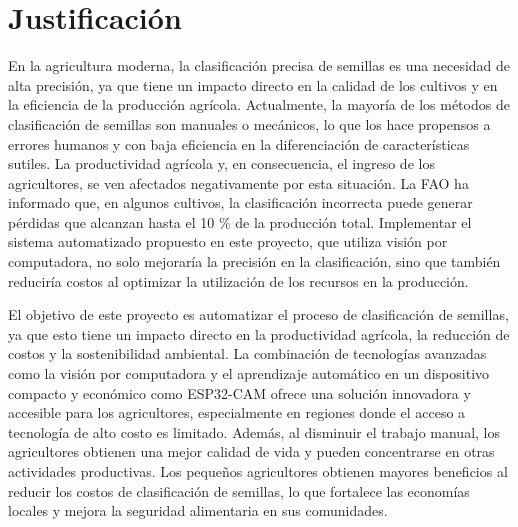 \section{Justificación}

En la agricultura moderna, la clasificación precisa de semillas es una necesidad de alta precisión, ya que tiene un impacto directo en la calidad de los cultivos y en la eficiencia de la producción agrícola. Actualmente, la mayoría de los métodos de clasificación de semillas son manuales o mecánicos, lo que los hace propensos a errores humanos y con baja eficiencia en la diferenciación de características sutiles. La productividad agrícola y, en consecuencia, el ingreso de los agricultores, se ven afectados negativamente por esta situación. La FAO ha informado que, en algunos cultivos, la clasificación incorrecta puede generar pérdidas que alcanzan hasta el 10 \% de la producción total. Implementar el sistema automatizado propuesto en este proyecto, que utiliza visión por computadora, no solo mejoraría la precisión en la clasificación, sino que también reduciría costos al optimizar la utilización de los recursos en la producción.


El objetivo de este proyecto es automatizar el proceso de clasificación de semillas, ya que esto tiene un impacto directo en la productividad agrícola, la reducción de costos y la sostenibilidad ambiental. La combinación de tecnologías avanzadas como la visión por computadora y el aprendizaje automático en un dispositivo compacto y económico como ESP32-CAM ofrece una solución innovadora y accesible para los agricultores, especialmente en regiones donde el acceso a tecnología de alto costo es limitado. Además, al disminuir el trabajo manual, los agricultores obtienen una mejor calidad de vida y pueden concentrarse en otras actividades productivas. Los pequeños agricultores obtienen mayores beneficios al reducir los costos de clasificación de semillas, lo que fortalece las economías locales y mejora la seguridad alimentaria en sus comunidades.

